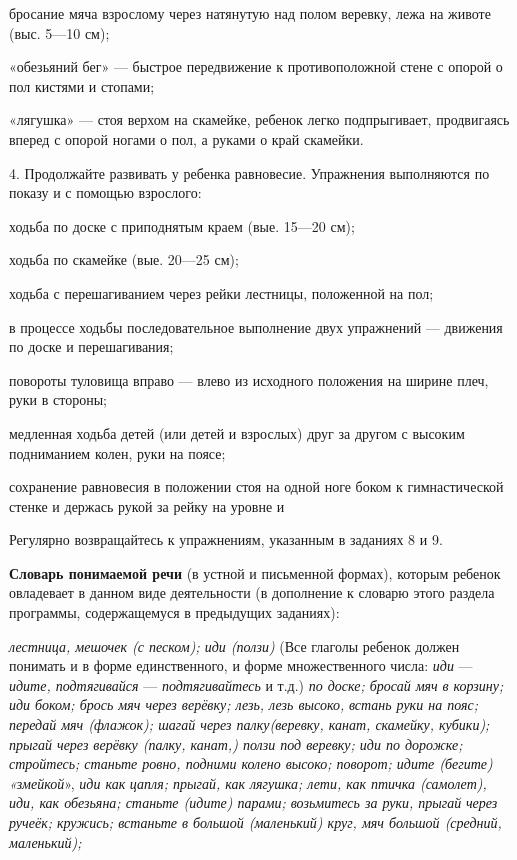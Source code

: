 \documentclass[a5paper]{book}
\renewcommand{\emph}[1]{\textit{#1}}
\begin{document}
бросание мяча взрослому через натянутую над полом веревку, лежа на
животе (выс. 5---10 см);

«обезьяний бег» --- быстрое передвижение к противоположной стене с
опорой о пол кистями и стопами;

«лягушка» --- стоя верхом на скамейке, ребенок легко подпрыгивает,
продвигаясь вперед с опорой ногами о пол, а руками о край скамейки.

4. Продолжайте развивать у ребенка равновесие. Упражнения выполняются по
показу и с помощью взрослого:

ходьба по доске с приподнятым краем (вые. 15---20 см);

ходьба по скамейке (вые. 20---25 см);

ходьба с перешагиванием через рейки лестницы, положенной на пол;

в процессе ходьбы последовательное выполнение двух упражнений ---
движения по доске и перешагивания;

повороты туловища вправо --- влево из исходного положения на ширине
плеч, руки в стороны;

медленная ходьба детей (или детей и взрослых) друг за другом с высоким
подниманием колен, руки на поясе;

сохранение равновесия в положении стоя на одной ноге боком к
гимнастической стенке и держась рукой за рейку на уровне и

Регулярно возвращайтесь к упражнениям, указанным в заданиях 8 и 9.

\textbf{Словарь понимаемой речи} (в устной и письменной формах), которым
ребенок овладевает в данном виде деятельности (в дополнение к словарю
этого раздела программы, содержащемуся в предыдущих заданиях):

\emph{лестница, мешочек (с песком); иди (ползи)} (Все глаголы ребенок
должен понимать и в форме единственного, и форме множественного числа:
\emph{иди} --- \emph{идите, подтягивайся} --- \emph{подтягивайтесь} и
т.д.) \emph{по доске; бросай мяч} \emph{в корзину; иди боком; брось мяч
через верёвку; лезь, лезь высоко,} \emph{встань руки на пояс; передай
мяч (флажок); шагай через палку(веревку, канат, скамейку, кубики);
прыгай через верёвку (палку, канат,) ползи под веревку; иди по дорожке;
стройтесь; станьте ровно, подними колено высоко; поворот; идите (бегите)
«змейкой}», \emph{иди как} \emph{цапля; прыгай, как лягушка; лети, как
птичка (самолет), иди, как обезьяна; станьте (идите) парами; возьмитесь
за руки, прыгай} \emph{через ручеёк; кружись; встаньте в большой
(маленький) круг, мяч большой (средний, маленький);}
\end{document}
